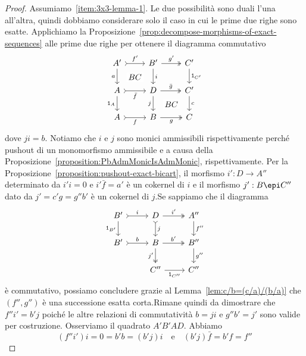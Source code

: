 \begin{proof}
  Assumiamo~\ref{item:3x3-lemma-1}. Le due possibilità sono duali l'una
  all'altra, quindi dobbiamo considerare solo il caso in cui le prime
  due righe sono esatte. Applichiamo la
  Proposizione~\ref{prop:decompose-morphisms-of-exact-sequences} alle
  prime due righe per ottenere il diagramma commutativo
  \[
    \begin{tikzcd}
      A' \ar["{a}", d, swap] \ar["{BC}" description, phantom, dr]
      \ar["{f'}", rightarrowtail, r] & B' \ar["{i}", d] \ar["{g'}",
      twoheadrightarrow, r] & C' \ar["{\id_{C'}}", d] \\
      A \ar["{\id_A}", d, swap] \ar["{\bar f}", rightarrowtail, r, swap]
      & D \ar["{j}", d, swap] \ar["{BC}" description, phantom, dr]
      \ar["{\bar g}", twoheadrightarrow, r] & C'
      \ar["c", d] \\
      A \ar["{f}", rightarrowtail, r, swap] & B \ar["{g}",
      twoheadrightarrow, r, swap] & C
    \end{tikzcd}
  \]
  dove \(ji = b\). Notiamo che \(i\) e \(j\) sono monici ammissibili
  rispettivamente perché pushout di un monomorfismo ammissibile e a
  causa della Proposizione~\ref{proposition:PbAdmMonicIsAdmMonic},
  rispettivamente. Per la
  Proposizione~\ref{proposition:pushout-exact-bicart}, il morfismo
  \(i': D \to A''\) determinato da \(i'i = 0\) e \(i'\bar{f} = a'\) è un
  cokernel di \(i\) e il morfismo \(j': B \epi C''\) dato da
  \(j' = c'g = g'' b'\) è un cokernel di \(j\).\newline Se sappiamo che il
  diagramma
  \[
    \begin{tikzcd}
      B' \ar["{\id_{B'}}", d, swap] \ar["{i}", rightarrowtail, r] & D
      \ar["{j}", rightarrowtail, d] \ar["{i'}",
      twoheadrightarrow, r] & A'' \ar["{f''}", d] \\
      B' \ar["{b}", rightarrowtail, r] & B \ar["{j'}",
      twoheadrightarrow, d, swap] \ar["{b'}",
      twoheadrightarrow, r] & B'' \ar["{g''}", d] \\
      & C'' \ar["{\id_{C''}}", r, swap] & C ''
    \end{tikzcd}
  \]
  è commutativo, possiamo concludere grazie al
  Lemma~\ref{lem:c/b=(c/a)/(b/a)} che \((f'',g'')\) è una successione
  esatta corta.\newline Rimane quindi da dimostrare che
  \(f'' i' = b' j\) poiché le altre relazioni di commutatività
  \(b = ji\) e \(g''b' = j'\) sono valide per costruzione. Osserviamo il
  quadrato \(A'B'AD\). Abbiamo
  \[
    (f'' i') i = 0 = b'b = (b'j) i \quad \text{e} \quad (b'j)\bar{f} = b'f = f''
\]
\end{proof}

